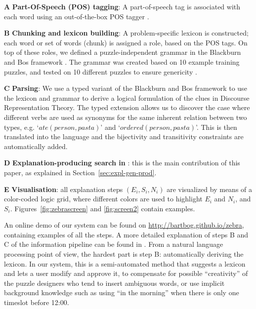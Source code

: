 \begin{compactenum}
	\item[\bf A] \textbf{Part-Of-Speech (POS) tagging}: A part-of-speech tag is associated with each word using an out-of-the-box POS tagger \cite{DBLP:journals/coling/MarcusSM94}.
	\item[\bf B] \textbf{Chunking and lexicon building}: A problem-specific lexicon is constructed; each word or set of words (chunk) is assigned a role, based on the POS tags. On top of these roles, we defined a puzzle-independent grammar in the Blackburn and Bos framework \cite{Blackburn2005,Blackburn2006}. The grammar was created based on 10 example training puzzles, and tested on 10 different puzzles to ensure genericity \cite{msc/Claes17}. 
	\item[\bf C] \textbf{Parsing}: We use a typed variant of the Blackburn and Bos framework to use the lexicon and grammar to derive a logical formulation of the clues in Discourse Representation Theory. The typed extension allows us to discover the case where different verbs are used as synonyms for the same inherent relation between two types, e.g. `$ate(person, pasta)$' and `$ordered(person, pasta)$'. This is then translated into the \idp language and the bijectivity and transitivity constraints are automatically added. 
	\item[\bf D] \textbf{Explanation-producing search in \idp}: this is the main contribution of this paper, as explained in Section~\ref{sec:expl-gen-prod}.
	\item[\bf E] \textbf{Visualisation}: all  explanation steps $(E_i, S_i, N_i)$ are visualized by means of a color-coded logic grid, where different colors are used to highlight $E_i$ and $N_i$, and $S_i$. Figures~\ref{fig:zebrascreen} and \ref{fig:screen2} contain examples.
\end{compactenum}


\noindent
An online demo of our system can be found on \url{http://bartbog.github.io/zebra}, containing examples of all the steps. 
% 
A more detailed explanation of steps B and C of the information pipeline can be found in \cite{msc/Claes17}. From a natural language processing point of view, the hardest part is step B: automatically deriving the lexicon. In our system, this is a semi-automated method that suggests a lexicon and lets a user modify and approve it, to compensate for possible ``creativity'' of the puzzle designers who tend to insert ambiguous words, or use implicit background knowledge such as using ``in the morning'' when there is only one timeslot before 12:00.
